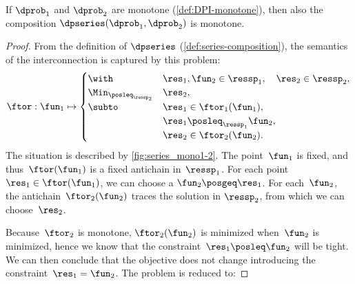 \begin{proposition}
    \label{pro:series-monotone}If $\dprob_{1}$ and $\dprob_{2}$ are
    monotone (\cref{def:DPI-monotone}), then also the composition $\dpseries(\dprob_{1},\dprob_{2})$
    is monotone.
\end{proposition}
\begin{proof}
    From the definition of $\dpseries$ (\cref{def:series-composition}),
    the semantics of the interconnection is captured by this problem:
    \begin{equation}
        \ftor:\fun_{1}\mapsto\begin{cases}
                                 \with & \res_{1},\fun_{2}\in\ressp_{1},\quad\res_{2}\in\ressp_{2},\\
                                 \Min_{\posleq_{\ressp_{2}}} & \res_{2},\\
                                 \subto & \res_{1}\in\ftor_{1}(\fun_{1}),\\
                                 & \res_{1}\posleq_{\ressp_{1}}\fun_{2},\\
                                 & \res_{2}\in\ftor_{2}(\fun_{2}).
        \end{cases}\label{eq:dede}
    \end{equation}
    The situation is described by \cref{fig:series_mono1-2}. The point~$\fun_{1}$
    is fixed, and thus~$\ftor(\fun_{1})$ is a fixed antichain in~$\ressp_{1}$.
    For each point $\res_{1}\in\ftor(\fun_{1})$, we can choose a $\fun_{2}\posgeq\res_{1}$.
    For each~$\fun_{2}$, the antichain~$\ftor_{2}(\fun_{2})$ traces
    the solution in $\ressp_{2}$, from which we can choose~$\res_{2}$.


    \noindent Because~$\ftor_{2}$ is monotone, $\ftor_{2}(\fun_{2})$
    is minimized when~$\fun_{2}$ is minimized, hence we know that the
    constraint~$\res_{1}\posleq\fun_{2}$ will be tight. We can then
    conclude that the objective does not change introducing the constraint~$\res_{1}=\fun_{2}$.
    The problem is reduced to:


\end{proof}
